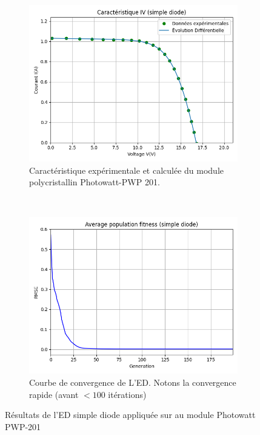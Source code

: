 \begin{figure}
    \centering
    \begin{subfigure}[b]{0.45\textwidth}
        \includegraphics[width=\textwidth]{resources/pwp/iv.png}
        \caption{Caractéristique expérimentale et calculée du module polycristallin Photowatt-PWP 201.}
    \end{subfigure}
    ~
    \begin{subfigure}[b]{0.45\textwidth}
        \includegraphics[width=\textwidth]{resources/pwp/fitness.png}
        \caption{Courbe de convergence de L'ED. Notons la convergence rapide (avant $< 100$ itérations)}
    \end{subfigure}
    \caption{Résultats de l'ED simple diode appliquée sur au module Photowatt PWP-201}
    \label{fig:pwpsingle}
\end{figure}

